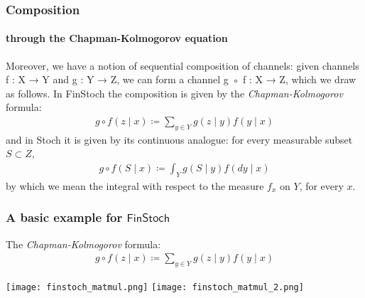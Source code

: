 \begin{frame}
    \frametitle{Composition}
    \framesubtitle{through the Chapman-Kolmogorov equation}
    Moreover, we have a notion of sequential composition of channels: given channels f : X → Y and g : Y → Z, we can form a channel g ◦ f : X → Z, which we draw as follows.
    In FinStoch the composition is given by the \emph{Chapman-Kolmogorov} formula:
    \begin{align}
        g\circ f (z\mid x) \coloneqq \sum_{y\in Y} g(z\mid y) f(y\mid x)
    \end{align}
    and in Stoch it is given by its continuous analogue: for every measurable subset $S\subset Z$,
    \begin{align}
        g\circ f (S\mid x) \coloneqq \int_Y g(S\mid y) f(dy\mid x)
    \end{align}
    by which we mean the integral with respect to the measure $f_x$ on $Y$, for every $x$.
\end{frame}

\begin{frame}
    \frametitle{A basic example for $\mathsf{FinStoch}$}
    \begin{minipage}{.48\textwidth}
    The \emph{Chapman-Kolmogorov} formula:
    \begin{align*}
        g\circ f (z\mid x) \coloneqq \sum_{y\in Y} g(z\mid y) f(y\mid x)
    \end{align*}
    \end{minipage}
    \hfill
    \begin{minipage}{.45\textwidth}
        \texttt{[image: finstoch\_matmul.png]}
        \texttt{[image: finstoch\_matmul\_2.png]}
    \end{minipage}
    
\end{frame}

